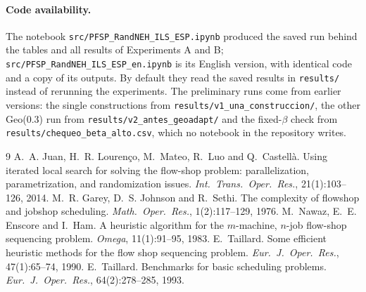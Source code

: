 \documentclass[10pt,a4paper]{article}
\begin{document}
\paragraph{Code availability.} The notebook \texttt{src/PFSP\_RandNEH\_ILS\_ESP.ipynb} produced the saved
run behind the tables and all results of Experiments A and B; \texttt{src/PFSP\_RandNEH\_ILS\_ESP\_en.ipynb}
is its English version, with identical code and a copy of its outputs. By default they read the saved
results in \texttt{results/} instead of rerunning the experiments. The
preliminary runs come from earlier versions: the single constructions from
\texttt{results/v1\_una\_construccion/}, the other Geo(0.3) run from \texttt{results/v2\_antes\_geoadapt/}
and the fixed-$\beta$ check from
\texttt{results/chequeo\_beta\_alto.csv}, which no notebook in the repository writes.

\begin{thebibliography}{9}
\footnotesize\setlength{\itemsep}{0pt}\setlength{\parskip}{0pt}
 A.~A. Juan, H.~R. Louren\c{c}o, M.~Mateo, R.~Luo and Q.~Castell\`a. Using iterated
local search for solving the flow-shop problem: parallelization, parametrization, and randomization
issues. \emph{Int.\ Trans.\ Oper.\ Res.}, 21(1):103--126, 2014.
 M.~R. Garey, D.~S. Johnson and R.~Sethi. The complexity of flowshop and jobshop
scheduling. \emph{Math.\ Oper.\ Res.}, 1(2):117--129, 1976.
 M.~Nawaz, E.~E. Enscore and I.~Ham. A heuristic algorithm for the $m$-machine, $n$-job
flow-shop sequencing problem. \emph{Omega}, 11(1):91--95, 1983.
 E.~Taillard. Some efficient heuristic methods for the flow shop sequencing
problem. \emph{Eur.\ J.\ Oper.\ Res.}, 47(1):65--74, 1990.
 E.~Taillard. Benchmarks for basic scheduling problems. \emph{Eur.\ J.\ Oper.\
Res.}, 64(2):278--285, 1993.
\end{thebibliography}
\end{document}
